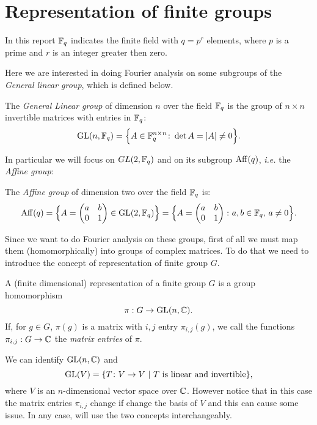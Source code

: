 \section{Representation of finite groups}
In this report ${\mathbb F}_q$ indicates the finite field with $q=p^r$ elements, where $p$ is a prime and $r$ is an integer greater then zero.

Here we are interested in doing Fourier analysis on some subgroups of the \emph{General linear group}, which is defined below. 
\begin{defn}
The {\it General Linear group} of dimension $n$ over the field ${\mathbb F}_q$ is the group of $n\times n$ invertible matrices with entries in ${\mathbb F}_q$:
\begin{equation*}
\operatorname{GL}(n,{\mathbb F}_q)=\Big\{ A \in {\mathbb F}_q^{n \times n} \colon \det A = \lvert A\rvert\neq 0 \Big\}.
\end{equation*}	
\end{defn}
In particular we will focus on $GL(2,{\mathbb F}_q)$ and on its subgroup $\operatorname{Aff}(q)$, \emph{i.e.} the \emph{Affine group}:
\begin{defn}
The {\emph{ Affine group}} of dimension two over the field ${\mathbb F}_q$ is:
\begin{equation}
\label{def:aff_group}
\operatorname{Aff} (q)=\Big\{ A=\begin{pmatrix} a & b \\ 0 & 1 \end{pmatrix}\in \operatorname{GL}(2,{\mathbb F}_q) \Big\}=\Big\{ A=\begin{pmatrix} a & b \\ 0 & 1 \end{pmatrix} \colon a,b \in {\mathbb F}_q, \, a \neq 0 \Big \}.
\end{equation}
\end{defn}
Since we want to do Fourier analysis on these groups, first of all we must map them (homomorphically) into groups of complex matrices. To do that we need to introduce the concept of representation of finite group $G$.

\begin{defn}
A (finite dimensional) representation of a finite group $G$ is a group homomorphism
\[
\pi:  G \rightarrow \operatorname{GL}(n,{\mathbb C}).
\]
If, for $g\in G$, $\pi(g)$ is a matrix with $i,j$ entry $\pi_{i,j}(g)$, we call the functions $\pi_{i,j} : G \rightarrow {\mathbb C}$ the \emph{matrix entries} of $\pi$.
\end{defn}
\begin{rem}
We can identify $\operatorname{GL}(n,{\mathbb C})$ and
\[
\operatorname{GL}(V)=\{T\colon V\rightarrow V \ | \  T \text{ is linear and invertible}\},
\]
where $V$ is an $n$-dimensional vector space over ${\mathbb C}$. However notice that in this case the matrix entries $\pi_{i,j}$ change if change the basis of $V$ and this can cause some issue. In any case, will use the two concepts interchangeably.
\end{rem}

